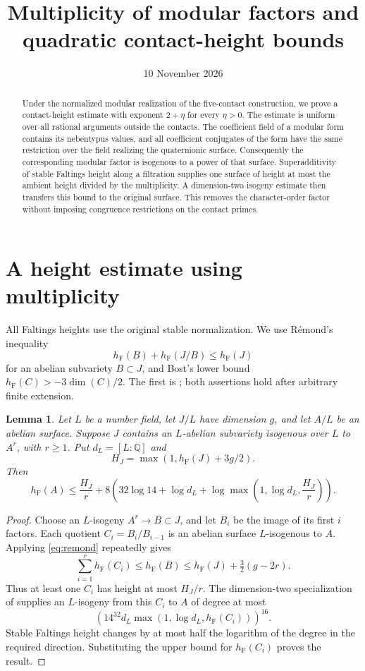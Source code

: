 \documentclass[11pt,a4paper]{article}
\title{Multiplicity of modular factors and quadratic contact-height bounds}
\author{}\date{10 November 2026}
\newtheorem{lemma}[theorem]{Lemma}
\newcommand{\Q}{\mathbb Q}
\newcommand{\hF}{h_{\mathrm F}}
\begin{document}
\maketitle
\begin{abstract}
Under the normalized modular realization of the five-contact construction,
we prove a contact-height estimate with exponent \(2+\eta\) for every
\(\eta>0\). The estimate is uniform over all rational arguments outside
the contacts. The coefficient field of a modular form contains its
nebentypus values, and all coefficient conjugates of the form have the
same restriction over the field realizing the quaternionic surface.
Consequently the corresponding modular factor is isogenous to a power
of that surface. Superadditivity of stable Faltings height along a
filtration supplies one surface of height at most the ambient height
divided by the multiplicity. A dimension-two isogeny estimate then
transfers this bound to the original surface. This removes the
character-order factor without imposing congruence restrictions on
the contact primes.
\end{abstract}

\section{A height estimate using multiplicity}

All Faltings heights use the original stable normalization. We use
R\'emond's inequality
\begin{equation}\label{eq:remond}
 \hF(B)+\hF(J/B)\le\hF(J)
\end{equation}
for an abelian subvariety \(B\subset J\), and Bost's lower bound
\(\hF(C)>-3\dim(C)/2\). The first is
\cite[Corollary~1.2 and the paragraph after Corollary~1.3]{Remond};
both assertions hold after arbitrary finite extension.

\begin{lemma}\label{lem:average}
Let \(L\) be a number field, let \(J/L\) have dimension \(g\), and
let \(A/L\) be an abelian surface. Suppose \(J\) contains an
\(L\)-abelian subvariety isogenous over \(L\) to \(A^r\), with \(r\ge1\).
Put \(d_L=[L:\Q]\) and
\[
 H_J=\max(1,\hF(J)+3g/2).
\]
Then
\[
 \hF(A)\le \frac{H_J}{r}
 +8\left(32\log14+\log d_L+
       \log\max\left(1,\log d_L,\frac{H_J}{r}\right)\right).
\]
\end{lemma}
\begin{proof}
Choose an \(L\)-isogeny \(A^r\to B\subset J\), and let \(B_i\)
be the image of its first \(i\) factors. Each quotient
\(C_i=B_i/B_{i-1}\) is an abelian surface \(L\)-isogenous to \(A\).
Applying \eqref{eq:remond} repeatedly gives
\[
 \sum_{i=1}^r\hF(C_i)\le\hF(B)
 \le\hF(J)+\tfrac32(g-2r).
\]
Thus at least one \(C_i\) has height at most \(H_J/r\).
The dimension-two specialization of
\cite[Theorem~1.9(1)]{GaudronRemond} supplies an \(L\)-isogeny
from this \(C_i\) to \(A\) of degree at most
\[
 \left(14^{32}d_L
       \max(1,\log d_L,\hF(C_i))\right)^{16}.
\]
Stable Faltings height changes by at most half the logarithm of
the degree in the required direction. Substituting the upper bound
for \(\hF(C_i)\) proves the result.
\end{proof}
\end{document}
